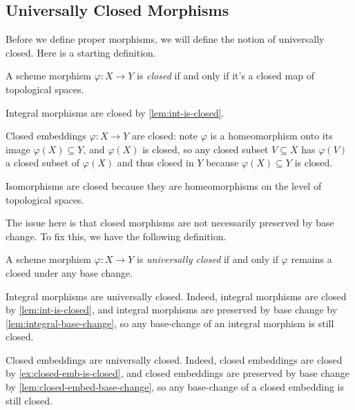 \documentclass[../notes.tex]{subfiles}
\begin{document}
\subsection{Universally Closed Morphisms}
Before we define proper morphisms, we will define the notion of universally closed. Here is a starting definition.
\begin{definition}[Closed]
	A scheme morphism $\varphi\colon X\to Y$ is \textit{closed} if and only if it's a closed map of topological spaces.
\end{definition}
\begin{example}
	Integral morphisms are closed by \autoref{lem:int-is-closed}.
\end{example}
\begin{example} \label{ex:closed-emb-is-closed}
	Closed embeddings $\varphi\colon X\to Y$ are closed: note $\varphi$ is a homeomorphism onto its image $\varphi(X)\subseteq Y$, and $\varphi(X)$ is closed, so any closed subset $V\subseteq X$ has $\varphi(V)$ a closed subset of $\varphi(X)$ and thus closed in $Y$ because $\varphi(X)\subseteq Y$ is closed.
\end{example}
\begin{example} \label{ex:iso-is-closed-map}
	Isomorphisms are closed because they are homeomorphisms on the level of topological spaces.
\end{example}
The issue here is that closed morphisms are not necessarily preserved by base change. To fix this, we have the following definition.
\begin{definition}
	A scheme morphism $\varphi\colon X\to Y$ is \textit{universally closed} if and only if $\varphi$ remains a closed under any base change.
\end{definition}
\begin{example} \label{ex:integral-is-univ-closed}
	Integral morphisms are universally closed. Indeed, integral morphisms are closed by \autoref{lem:int-is-closed}, and integral morphisms are preserved by base change by \autoref{lem:integral-base-change}, so any base-change of an integral morphism is still closed.
\end{example}
\begin{example} \label{ex:closed-emb-is-univ-closed}
	Closed embeddings are universally closed. Indeed, closed embeddings are closed by \autoref{ex:closed-emb-is-closed}, and closed embeddings are preserved by base change by \autoref{lem:closed-embed-base-change}, so any base-change of a closed embedding is still closed.
\end{example}
\end{document}
